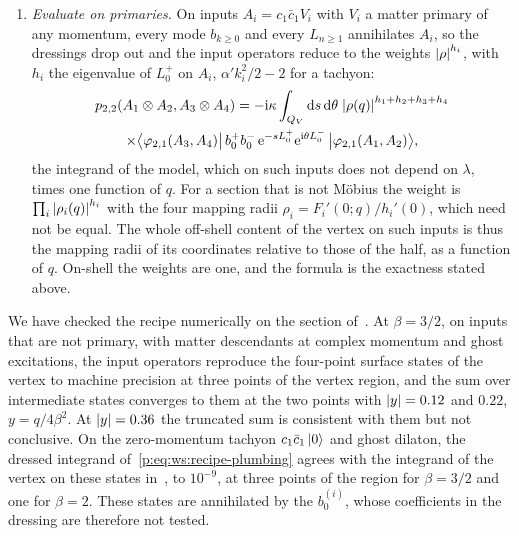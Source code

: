 \begin{enumerate}
  \item \emph{Evaluate on primaries.}
    On inputs $A_i = c_1 \bar c_1 V_i$ with $V_i$ a matter primary of any momentum, every mode $b_{k \geq 0}$ and every $L_{n \geq 1}$ annihilates $A_i$, so the dressings drop out and the input operators reduce to the weights ${|\rho|}^{h_i}$, with $h_i$ the eigenvalue of $L_0^+$ on $A_i$, $\alpha' k_i^2 / 2 - 2$ for a tachyon:
    \begin{multline}
      \label{p:eq:ws:recipe-primaries}
      p_{2,2}(A_1 \otimes A_2, A_3 \otimes A_4)
        = - \mathrm{i} \kappa \int_{Q_V} \mathrm{d} s \, \mathrm{d}\theta \; {|\rho(q)|}^{h_1 + h_2 + h_3 + h_4}
      \\
          \times \big\langle \varphi_{2,1}(A_3, A_4) \big| \, b_0^+ b_0^- \, \mathrm{e}^{- s L_0^+} \mathrm{e}^{\mathrm{i} \theta L_0^-} \, \big| \varphi_{2,1}(A_1, A_2) \big\rangle,
    \end{multline}
    the integrand of the model, which on such inputs does not depend on $\lambda$, times one function of $q$.
    For a section that is not Möbius the weight is $\prod_i {|\rho_i(q)|}^{h_i}$ with the four mapping radii $\rho_i = F_i'(0; q) / h_i'(0)$, which need not be equal.
    The whole off-shell content of the vertex on such inputs is thus the mapping radii of its coordinates relative to those of the half, as a function of $q$.
    On-shell the weights are one, and the formula is the exactness stated above.
\end{enumerate}
We have checked the recipe numerically on the section of~\cite{Erbin:2026:SL2CVerticesClosed}.
At $\beta = 3 / 2$, on inputs that are not primary, with matter descendants at complex momentum and ghost excitations, the input operators reproduce the four-point surface states of the vertex to machine precision at three points of the vertex region, and the sum over intermediate states converges to them at the two points with ${|y|} = 0.12$ and $0.22$, $y = q / 4 \beta^2$.
At ${|y|} = 0.36$ the truncated sum is consistent with them but not conclusive.
On the zero-momentum tachyon $c_1 \bar c_1 \ket{0}$ and ghost dilaton, the dressed integrand of~\eqref{p:eq:ws:recipe-plumbing} agrees with the integrand of the vertex on these states in~\cite{Erbin:2026:SL2CVerticesClosed}, to $10^{-9}$, at three points of the region for $\beta = 3 / 2$ and one for $\beta = 2$.
These states are annihilated by the $b_0^{(i)}$, whose coefficients in the dressing are therefore not tested.

